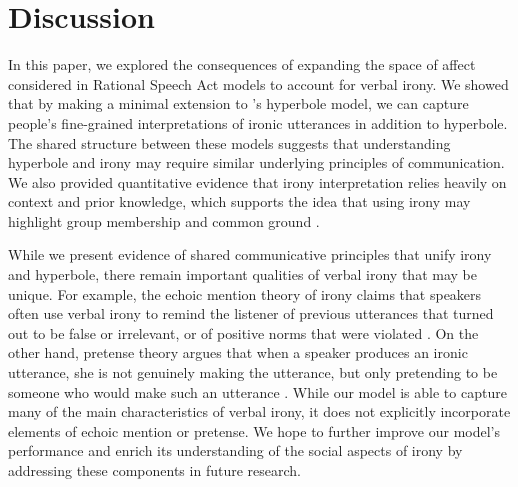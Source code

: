 \documentclass[10pt,letterpaper]{article}
\begin{document}

\section{Discussion}
In this paper, we explored the consequences of expanding the space of affect considered in Rational Speech Act models to account for verbal irony. We showed that by making a minimal extension to 's hyperbole model, we can capture people's fine-grained interpretations of ironic utterances in addition to hyperbole. The shared structure between these models suggests that understanding hyperbole and irony may require similar underlying principles of communication. We also provided quantitative evidence that irony interpretation relies heavily on context and prior knowledge, which supports the idea that using irony may highlight group membership and common ground \cite{gibbs2000irony}.

While we present evidence of shared communicative principles that unify irony and hyperbole, there remain important qualities of verbal irony that may be unique. For example, the echoic mention theory of irony claims that speakers often use verbal irony to remind the listener of previous utterances that turned out to be false or irrelevant, or of positive norms that were violated \cite{sperber1981irony, jorgensen1984test}. On the other hand, pretense theory argues that when a speaker produces an ironic utterance, she is not genuinely making the utterance, but only pretending to be someone who would make such an utterance \cite{clark1984pretense}. 
While our model is able to capture many of the main characteristics of verbal irony, it does not explicitly incorporate elements of echoic mention or pretense. We hope to further improve our model's performance and enrich its understanding of the social aspects of irony by addressing these components in future research. 
\end{document}
